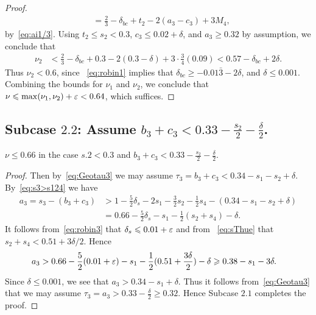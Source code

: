 \begin{proof}
\begin{align*}
  & = \frac{2}{3} -\delta_{bc}+ t_2 - 2(a_3-c_3) +3M_4,
  \end{align*}
  by~\eqref{eq:ai1/3}. Using
  $t_2\le s_2< 0.3$, $c_3\le 0.02+\delta$, and $a_3\ge 0.32$ by assumption, we conclude that
  \begin{align*}
  \nu_2
  & < \frac{2}{3} -\delta_{bc} + 0.3 - 2(0.3-\delta) + 3\cdot\frac{3}{4}(0.09) <
  0.57-\delta_{bc}+2\delta.
  \end{align*}
  Thus $\nu_2<0.6$, since
  ~\eqref{eq:robin1} implies that $\delta_{bc}\geq -0.01\bar3-2\delta$, and $\delta\leq 0.001$. Combining the bounds for $\nu_1$ and $\nu_2$, we conclude that $\nu \leqslant \max(\nu_1,\nu_2)+\varepsilon<0.64$, which suffices.
\end{proof}


\subsection*{Subcase $\mathbf{2.2}$: Assume
$b_3+c_3<0.33-\frac{s_2}{2}-\frac{\delta}{2}$.}

\begin{lemma}\label{lem:Subcase2.2}
  \leanok
  $\nu \leq 0.66$ in the case $s.2 < 0.3$ and $b_3+c_3<0.33-\frac{s_2}{2}-\frac{\delta}{2}$.
\end{lemma}
\begin{proof}
  Then by~\eqref{eq:Geotau3} we may assume $\tau_3=b_3+c_3<0.34-s_1-s_2+\delta$. By~\eqref{eq:s3>s124} we have
  \begin{align*}
  a_3 = s_3 - (b_3+c_3) &> 1 - \frac{5}{2}\delta_s - 2s_1 - \frac{3}{2}s_2 - \frac{1}{2}s_4 - (0.34-s_1-s_2+ \delta)\\
  & = 0.66- \frac{5}{2}\delta_s - s_1 - \frac{1}{2}(s_2+s_4)-\delta.
  \end{align*}
  It follows from~\eqref{eq:robin3} that $\delta_s\leqslant 0.01+\varepsilon$ and from
  ~\eqref{eq:sThue} that $s_2+s_4<0.51+3\delta/2$. Hence
  \begin{align*}
  a_3
  & > 0.66- \frac{5}{2}(0.01+\varepsilon) - s_1 - \frac{1}{2}(0.51+\frac{3\delta}{2}) - \delta \geqslant 0.38-s_1- 3\delta.
  \end{align*}
  Since $\delta\le 0.001$, we see that $a_3> 0.34-s_1+ \delta$.
  Thus it follows from~\eqref{eq:Geotau3} that we may assume $\tau_3=a_3>0.33-\frac{\delta}{2}\geq 0.32$. Hence Subcase
  $\mathbf{2.1}$ completes the proof.
\end{proof}




